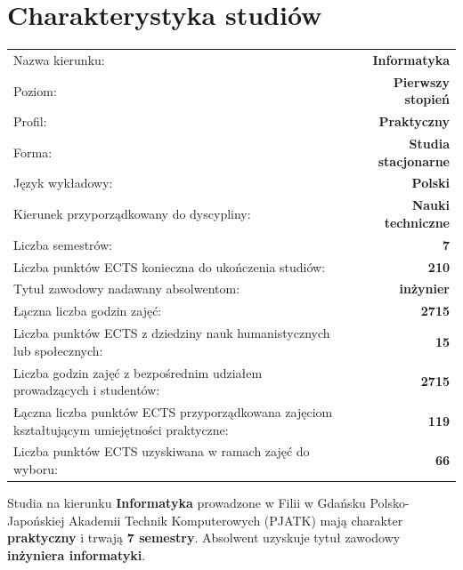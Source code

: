 \documentclass[12pt,a4paper]{article}
\renewcommand{\arraystretch}{1.35}
\begin{document}
\vspace{1cm}
\thispagestyle{empty}
\newpage
\setcounter{page}{1}

\tableofcontents
\newpage

\section{Charakterystyka studiów}

{\renewcommand{\arraystretch}{1.4}
\begin{tabularx}{\textwidth}{@{}Xr@{}}
\toprule
  {\small Nazwa kierunku:} & {\small\textbf{Informatyka}} \\
  {\small Poziom:} & {\small\textbf{Pierwszy stopień}} \\
  {\small Profil:} & {\small\textbf{Praktyczny}} \\
  {\small Forma:} & {\small\textbf{Studia stacjonarne}} \\
  {\small Język wykładowy:} & {\small\textbf{Polski}} \\
  {\small Kierunek przyporządkowany do dyscypliny:} & {\small\textbf{Nauki techniczne}} \\
\midrule
  {\small Liczba semestrów:} & {\small\textbf{7}} \\
  {\small Liczba punktów ECTS konieczna do ukończenia studiów:} & {\small\textbf{210}} \\
  {\small Tytuł zawodowy nadawany absolwentom:} & {\small\textbf{inżynier}} \\
\midrule
  {\small Łączna liczba godzin zajęć:} & {\small\textbf{2715}} \\
  {\small Liczba punktów ECTS z dziedziny nauk humanistycznych lub społecznych:} & {\small\textbf{15}} \\
  {\small Liczba godzin zajęć z bezpośrednim udziałem prowadzących i studentów:} & {\small\textbf{2715}} \\
  {\small Łączna liczba punktów ECTS przyporządkowana zajęciom kształtującym umiejętności praktyczne:} & {\small\textbf{119}} \\
  {\small Liczba punktów ECTS uzyskiwana w ramach zajęć do wyboru:} & {\small\textbf{66}} \\
\bottomrule
\end{tabularx}}

\bigskip


\newpage

Studia na kierunku \textbf{Informatyka} prowadzone w Filii w Gdańsku Polsko-Japońskiej Akademii Technik Komputerowych (PJATK) mają charakter \textbf{praktyczny} i trwają \textbf{7 semestry}. Absolwent uzyskuje tytuł zawodowy \textbf{inżyniera informatyki}.
\end{document}
